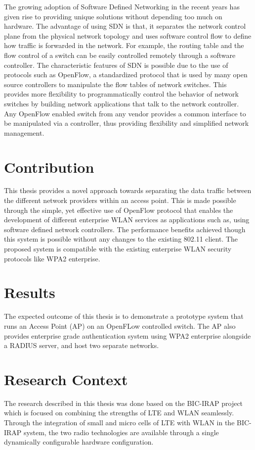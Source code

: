 The growing adoption of Software Defined Networking in the recent years has given rise to providing unique solutions without depending too much on hardware. The advantage of using SDN is that, it separates the network control plane from the physical network topology and uses software control flow to define how traffic is forwarded in the network. For example, the routing table and the flow control of a switch can be easily controlled remotely through a software controller. The characteristic features of SDN is possible due to the use of protocols such as OpenFlow, a standardized protocol that is used by many open source controllers to manipulate the flow tables of network switches. This provides more flexibility to programmatically control the behavior of network switches by building network applications that talk to the network controller. Any OpenFlow enabled switch from any vendor provides a common interface to be manipulated via a controller, thus providing flexibility and simplified network management.

\section{Contribution}\label{sec:contribution}

This thesis provides a novel approach towards separating the data traffic between the different network providers within an access point. This is made possible through the simple, yet effective use of OpenFlow protocol that enables the development of different enterprise WLAN services as applications such as, using software defined network controllers. The performance benefits achieved though this system is possible without any changes to the existing 802.11 client. The proposed system is compatible with the existing enterprise WLAN security protocols like WPA2 enterprise.

\section{Results}\label{sec:Results}
The expected outcome of this thesis is to demonstrate a prototype system that runs an Access Point (AP) on an OpenFLow controlled switch. The AP also provides enterprise grade authentication system using WPA2 enterprise alongside a RADIUS server, and host two separate networks. 

\section{Research Context\cite{BIC:IRAP}}\label{sec:BIC-IRAP}
The research described in this thesis was done based on the BIC-IRAP project which is focused on combining the strengths of LTE and WLAN seamlessly. Through the integration of small and micro cells of LTE with WLAN in the BIC-IRAP system, the two radio technologies are available through a single dynamically configurable hardware configuration.

